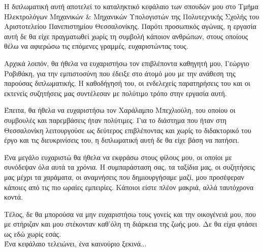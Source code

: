 \begin{acknowledgments}
    Η διπλωματική αυτή αποτελεί το καταληκτικό κεφάλαιο των σπουδών μου στο Τμήμα Ηλεκτρολόγων Μηχανικών \& Μηχανικών Υπολογιστών της Πολυτεχνικής Σχολής του Αριστοτελείου Πανεπιστημίου Θεσσαλονίκης. Παρότι προσωπικός αγώνας, η εργασία αυτή δε θα είχε πραγματωθεί χωρίς τη συμβολή κάποιον ανθρώπων, στους οποίους θέλω να αφιερώσω τις επόμενες γραμμές, ευχαριστώντας τους.
    
    Αρχικά λοιπόν, θα ήθελα να ευχαριστήσω τον επιβλέποντα καθηγητή μου, Γεώργιο Ροβιθάκη, για την εμπιστοσύνη που έδειξε στο άτομό μου με την ανάθεση της παρούσας διπλωματικής. Η καθοδήγησή του, οι ενδελεχείς παρατηρήσεις του και οι εκτενείς συζητήσεις μας συντέλεσαν με πολύτιμο τρόπο στην εργασία αυτή.

    
    Έπειτα, θα ήθελα να ευχαριστήσω τον Χαράλαμπο Μπεχλιούλη, του οποίου οι συμβουλές και παρεμβάσεις ήταν πολύτιμες. Για το διάστημα που ήταν στη Θεσσαλονίκη λειτουργούσε ως δεύτερος επιβλέποντας και χωρίς το διδακτορικό του έργο και τις διευκρινίσεις του, η διπλωματική αυτή δε θα είχε βάση να πατήσει.
    
    Ένα μεγάλο ευχαριστώ θα ήθελα να εκφράσω στους φίλους μου, οι οποίοι με συνόδεψαν όλα αυτά τα χρόνια. Η συμπαράσταση σας, τα ταξίδια μας, οι συζητήσεις μας μέχρι τα χαράματα, οι αναμνήσεις που δημιουργήσαμε μαζί, μου προσέφεραν κάποιες από τις πιο ωραίες εμπειρίες. Κάποιοι είστε πλέον μακριά, αλλά ταυτόχρονα κοντά.
    
    Τέλος, δε θα μπορούσα να μην ευχαριστήσω τους γονείς και την οικογένειά μου, που με στήριζαν και μου στέκονταν καθ'όλη τη διάρκεια της ζωής μου. Δε θα είχα φτάσει ως εδώ χωρίς εσάς. \\[\baselineskip]

    Ένα κεφάλαιο τελειώνει, ένα καινούριο ξεκινά...
\end{acknowledgments}